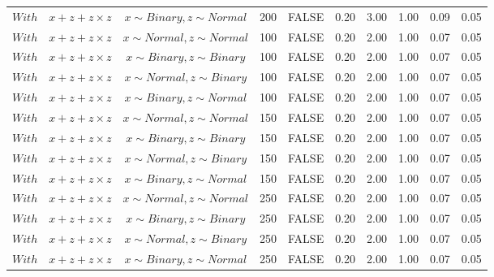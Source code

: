 \begin{longtable}{lccccccccc}
  $With$ & $\textit{x} + \textit{z} + \textit{z} \times \textit{z}$ & $\textit{x} \sim Binary, \textit{z} \sim Normal$ & 200 & FALSE & 0.20 & 3.00 & 1.00 & 0.09 & 0.05 \\ 
  $With$ & $\textit{x} + \textit{z} + \textit{z} \times \textit{z}$ & $\textit{x} \sim Normal , \textit{z} \sim Normal$ & 100 & FALSE & 0.20 & 2.00 & 1.00 & 0.07 & 0.05 \\ 
  $With$ & $\textit{x} + \textit{z} + \textit{z} \times \textit{z}$ & $\textit{x} \sim Binary, \textit{z} \sim Binary$ & 100 & FALSE & 0.20 & 2.00 & 1.00 & 0.07 & 0.05 \\ 
  $With$ & $\textit{x} + \textit{z} + \textit{z} \times \textit{z}$ & $\textit{x} \sim Normal, \textit{z} \sim Binary$ & 100 & FALSE & 0.20 & 2.00 & 1.00 & 0.07 & 0.05 \\ 
  $With$ & $\textit{x} + \textit{z} + \textit{z} \times \textit{z}$ & $\textit{x} \sim Binary, \textit{z} \sim Normal$ & 100 & FALSE & 0.20 & 2.00 & 1.00 & 0.07 & 0.05 \\ 
  $With$ & $\textit{x} + \textit{z} + \textit{z} \times \textit{z}$ & $\textit{x} \sim Normal , \textit{z} \sim Normal$ & 150 & FALSE & 0.20 & 2.00 & 1.00 & 0.07 & 0.05 \\ 
  $With$ & $\textit{x} + \textit{z} + \textit{z} \times \textit{z}$ & $\textit{x} \sim Binary, \textit{z} \sim Binary$ & 150 & FALSE & 0.20 & 2.00 & 1.00 & 0.07 & 0.05 \\ 
  $With$ & $\textit{x} + \textit{z} + \textit{z} \times \textit{z}$ & $\textit{x} \sim Normal, \textit{z} \sim Binary$ & 150 & FALSE & 0.20 & 2.00 & 1.00 & 0.07 & 0.05 \\ 
  $With$ & $\textit{x} + \textit{z} + \textit{z} \times \textit{z}$ & $\textit{x} \sim Binary, \textit{z} \sim Normal$ & 150 & FALSE & 0.20 & 2.00 & 1.00 & 0.07 & 0.05 \\ 
  $With$ & $\textit{x} + \textit{z} + \textit{z} \times \textit{z}$ & $\textit{x} \sim Normal , \textit{z} \sim Normal$ & 250 & FALSE & 0.20 & 2.00 & 1.00 & 0.07 & 0.05 \\ 
  $With$ & $\textit{x} + \textit{z} + \textit{z} \times \textit{z}$ & $\textit{x} \sim Binary, \textit{z} \sim Binary$ & 250 & FALSE & 0.20 & 2.00 & 1.00 & 0.07 & 0.05 \\ 
  $With$ & $\textit{x} + \textit{z} + \textit{z} \times \textit{z}$ & $\textit{x} \sim Normal, \textit{z} \sim Binary$ & 250 & FALSE & 0.20 & 2.00 & 1.00 & 0.07 & 0.05 \\ 
  $With$ & $\textit{x} + \textit{z} + \textit{z} \times \textit{z}$ & $\textit{x} \sim Binary, \textit{z} \sim Normal$ & 250 & FALSE & 0.20 & 2.00 & 1.00 & 0.07 & 0.05 \\ 

\end{longtable}
